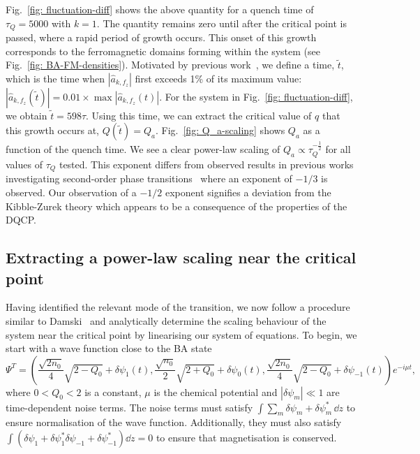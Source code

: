 Fig.~\ref{fig: fluctuation-diff} shows the above quantity for a quench time
of \(\tau_Q=5000\) with \(k=1\).
The quantity remains zero until after the critical point is passed, where
a rapid period of growth occurs.
This onset of this growth corresponds to the ferromagnetic domains forming
within the system (see Fig.~\ref{fig: BA-FM-densities}).
Motivated by previous work~\cite{Damski2007, Qiu2020}, we define a time,
\( \tilde{t} \), which is the time when \(|\hat{a}_{k, {f_z}}|\) first
exceeds 1\% of its maximum value: \(|\hat{a}_{k, {f_z}}(\tilde{t})| =
0.01\times \max|\hat{a}_{k, {f_z}}(t)|\).
For the system in Fig.~\ref{fig: fluctuation-diff}, we obtain
\(\tilde{t}=598\tau \).
Using this time, we can extract the critical value of \( q \) that this growth
occurs at, \(Q(\tilde{t}) = Q_a\).
Fig.~\ref{fig: Q_a-scaling} shows \(Q_a\) as a function of the quench time.
We see a clear power-law scaling of \(Q_a \propto \tau_Q^{-\frac{1}{2}}\) for
all values of \( \tau_Q \) tested.
This exponent differs from observed results in previous works investigating
second-order phase transitions~\cite{Damski2007, Anquez2016, Swislocki2013}
where an exponent of \(-1/3\) is observed.
Our observation of a \(-1/2\) exponent signifies a deviation from
the Kibble-Zurek theory which appears to be a consequence of the properties of
the DQCP\@.

\subsection{Extracting a power-law scaling near the critical point}
Having identified the relevant mode of the transition, we now follow a procedure
similar to Damski~\cite{Damski2007} and analytically determine the scaling
behaviour of the system near the critical point by linearising our system of
equations.
To begin, we start with a wave function close to the BA state
\begin{equation}\label{eq: spin-1-perturbed-BA-state}
    \Psi^T = \left(\frac{\sqrt{2n_0}}{4}\sqrt{2 - Q_0} + \delta\psi_{1}(t),
    \frac{\sqrt{n_0}}{2}\sqrt{2 + Q_0} + \delta \psi_0(t),
    \frac{\sqrt{2n_0}}{4}\sqrt{2 - Q_0} + \delta\psi_{-1}(t)\right)e^{-i\mu t},
\end{equation}
where \( 0 < Q_0 < 2 \) is a constant, \(\mu \) is the
chemical potential and \( |\delta\psi_m| \ll 1 \) are time-dependent noise
terms.
The noise terms must satisfy \(\int \sum_m\delta\psi_m+\delta\psi_m^* \, \dd z\)
to ensure normalisation of the wave function.
Additionally, they must also satisfy \(\int (\delta\psi_1 + \delta\psi_1^* 
\delta\psi_{-1} + \delta\psi_{-1}^*) \dd z = 0\) to ensure that magnetisation
is conserved.

